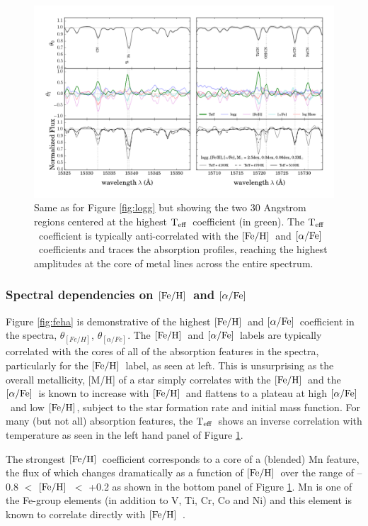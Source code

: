 \documentclass[12pt, preprint]{aastex}
\newcommand{\teff}{\mbox{$\rm T_{eff}$}}
\newcommand{\feh}{\mbox{$\rm [Fe/H]$}}
\newcommand{\alphafe}{\mbox{$\rm [\alpha/Fe]$}}
\begin{document}
\begin{figure}[p]
\centering
    \includegraphics[scale=0.51]{./plots/coeffs_t_3.png}
  \caption{Same as for Figure \ref{fig:logg} but showing the two 30 Angstrom regions centered at the highest \teff\ coefficient (in green). The \teff\ coefficient is typically anti-correlated with the \feh\ and \alphafe\ coefficients and traces the absorption profiles, reaching the highest amplitudes at the core of metal lines across the entire spectrum.}
\label{fig:teff}
\end{figure}


\subsubsection{Spectral dependencies on \feh\ and \alphafe} 

Figure \ref{fig:feha} is demonstrative of the highest \feh\ and \alphafe\ coefficient in the spectra, $\theta_{[Fe/H]}$, $\theta_{[\alpha/Fe]}$. The \feh\ and \alphafe\ labels are typically correlated with the cores of all of the absorption features in the spectra, particularly for the \feh\ label, as seen at left. This is unsurprising as the overall metallicity,  [M/H] of  a star simply correlates with the \feh\ and the \alphafe\ is known to increase with \feh\ and flattens to a plateau at high \alphafe\ and low \feh, subject to the star formation rate and initial mass function. For many (but not all) absorption features, the \teff\ shows an inverse correlation with temperature as seen in the left hand panel of Figure \ref{fig:teff}. 

The strongest \feh\ coefficient corresponds to a core of a (blended) Mn feature, the flux of which changes dramatically as a function of \feh\ over the range of  --0.8 $<$ \feh\ $<$ +0.2 as shown in the bottom panel of Figure \ref{fig:teff}. Mn is one of the Fe-group elements (in addition to V, Ti, Cr, Co and Ni) and this element is known to correlate directly with \feh\ \citep[see][]{Maria2008, B2015}. 
\end{document}

